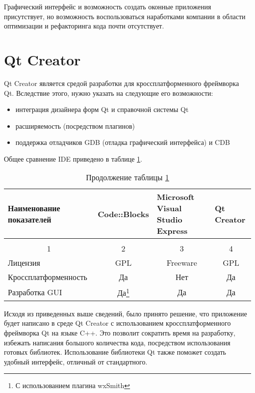 	Графический интерфейс и возможность создать оконные приложения присутствует, но возможность воспользоваться наработками компании в области оптимизации и рефакторинга кода почти отсутствует.
	
	\section{Qt Creator}
	
	Qt Creator является средой разработки для кроссплатформенного фреймворка Qt. Вследствие этого, нужно указать на следующие его возможности:
	\begin{itemize}
		\item интеграция дизайнера форм Qt и справочной системы Qt
		\item расширяемость (посредством плагинов)
		\item поддержка отладчиков GDB (отладка графический интерфейса) и CDB
	\end{itemize}
	
	Общее сравнение IDE приведено в таблице \ref{tab:ide_effect}.
	
	\begin{longtable}{|p{3.5cm}|p{3.5cm}|p{4cm}|p{3.5cm}|}
		\caption{Сравнение IDE\label{tab:ide_effect}}\\
		\hline %
	Наименование показателей & Code::Blocks & Microsoft Visual Studio Express & Qt Creator \\
		\hline
		\endfirsthead %
		\caption*{Продолжение таблицы \ref{tab:ide_effect}}\\
		\hline
		\multicolumn{1}{|c|}{1} & \multicolumn{1}{|c|}{2 } & \multicolumn{1}{|c|}{3} & \multicolumn{1}{|c|}{4}\\
		\endhead %
		\hline
		
		Лицензия & \multicolumn{1}{c|}{GPL} & \multicolumn{1}{c|}{Freeware} & \multicolumn{1}{c|}{GPL} \\
		\hline
		Кроссплат\-форменность & \multicolumn{1}{c|}{Да} & \multicolumn{1}{c|}{Нет} & \multicolumn{1}{c|}{Да}  \\
		\hline
		Разработка GUI & \multicolumn{1}{c|}{Да\footnote{С использованием плагина wxSmith}} & \multicolumn{1}{c|}{Да} & \multicolumn{1}{c|}{Да} \\
		
		\hline
	\end{longtable}
	
	
	Исходя из приведенных выше сведений, было принято решение, что приложение будет написано в среде Qt Creator с использованием кроссплатформенного фреймворка Qt на языке C++. Это позволит сократить время на разработку, избежать написания большого количества кода, посредством использования готовых библиотек. Использование библиотеки Qt также поможет создать удобный интерфейс, отличный от стандартного.